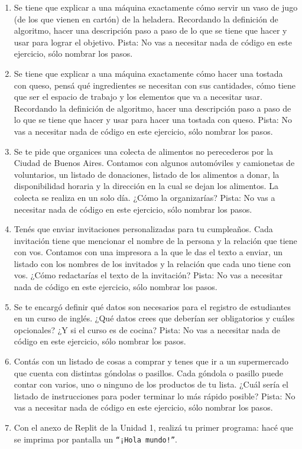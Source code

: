 \documentclass[
  letterpaper,
  DIV=11,
  numbers=noendperiod]{scrreprt}
\begin{document}
\begin{enumerate}
\def\labelenumi{\arabic{enumi}.}
\item
  Se tiene que explicar a una máquina exactamente cómo servir un vaso de
  jugo (de los que vienen en cartón) de la heladera. Recordando la
  definición de algoritmo, hacer una descripción paso a paso de lo que
  se tiene que hacer y usar para lograr el objetivo. Pista: No vas a
  necesitar nada de código en este ejercicio, sólo nombrar los pasos.
\item
  Se tiene que explicar a una máquina exactamente cómo hacer una tostada
  con queso, pensá qué ingredientes se necesitan con sus cantidades,
  cómo tiene que ser el espacio de trabajo y los elementos que va a
  necesitar usar. Recordando la definición de algoritmo, hacer una
  descripción paso a paso de lo que se tiene que hacer y usar para hacer
  una tostada con queso. Pista: No vas a necesitar nada de código en
  este ejercicio, sólo nombrar los pasos.
\item
  Se te pide que organices una colecta de alimentos no perecederos por
  la Ciudad de Buenos Aires. Contamos con algunos automóviles y
  camionetas de voluntarios, un listado de donaciones, listado de los
  alimentos a donar, la disponibilidad horaria y la dirección en la cual
  se dejan los alimentos. La colecta se realiza en un solo día. ¿Cómo la
  organizarías? Pista: No vas a necesitar nada de código en este
  ejercicio, sólo nombrar los pasos.
\item
  Tenés que enviar invitaciones personalizadas para tu cumpleaños. Cada
  invitación tiene que mencionar el nombre de la persona y la relación
  que tiene con vos. Contamos con una impresora a la que le das el texto
  a enviar, un listado con los nombres de los invitados y la relación
  que cada uno tiene con vos. ¿Cómo redactarías el texto de la
  invitación? Pista: No vas a necesitar nada de código en este
  ejercicio, sólo nombrar los pasos.
\item
  Se te encargó definir qué datos son necesarios para el registro de
  estudiantes en un curso de inglés. ¿Qué datos crees que deberían ser
  obligatorios y cuáles opcionales? ¿Y si el curso es de cocina? Pista:
  No vas a necesitar nada de código en este ejercicio, sólo nombrar los
  pasos.
\item
  Contás con un listado de cosas a comprar y tenes que ir a un
  supermercado que cuenta con distintas góndolas o pasillos. Cada
  góndola o pasillo puede contar con varios, uno o ninguno de los
  productos de tu lista. ¿Cuál sería el listado de instrucciones para
  poder terminar lo más rápido posible? Pista: No vas a necesitar nada
  de código en este ejercicio, sólo nombrar los pasos.
\item
  Con el anexo de Replit de la Unidad 1, realizá tu primer programa:
  hacé que se imprima por pantalla un \texttt{“¡Hola\ mundo!”}.
\end{enumerate}
\end{document}

